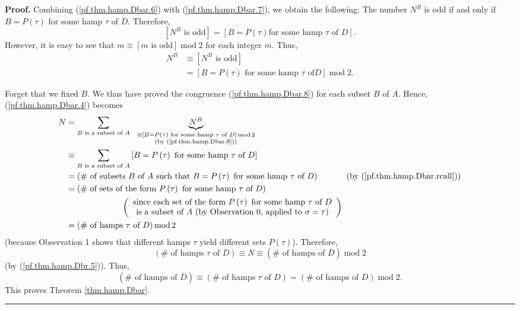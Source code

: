 \documentclass[numbers=enddot,12pt,final,onecolumn,notitlepage]{scrartcl}%
\numberwithin{exer}{subsection}
\theoremstyle{definition}
\newenvironment{proof}[1][Proof]{\noindent\textbf{#1.} }{\ \rule{0.5em}{0.5em}}
\let\sumnonlimits\sum
\renewcommand{\sum}{\sumnonlimits\limits}
\begin{document}
\begin{proof}
Combining (\ref{pf.thm.hamp.Dbar.6}) with (\ref{pf.thm.hamp.Dbar.7}), we
obtain the following: The number $N^{B}$ is odd if and only if $B=P\left(
\tau\right)  $ for some hamp $\tau$ of $D$. Therefore,%
\[
\left[  N^{B}\text{ is odd}\right]  =\left[  B=P\left(  \tau\right)  \text{
for some hamp }\tau\text{ of }D\right]  .
\]
However, it is easy to see that $m\equiv\left[  m\text{ is odd}\right]
\operatorname{mod}2$ for each integer $m$. Thus,%
\begin{align}
N^{B}  &  \equiv\left[  N^{B}\text{ is odd}\right] \nonumber\\
&  =\left[  B=P\left(  \tau\right)  \text{ for some hamp }\tau\text{ of
}D\right]  \operatorname{mod}2. \label{pf.thm.hamp.Dbar.8}%
\end{align}


Forget that we fixed $B$. We thus have proved the congruence
(\ref{pf.thm.hamp.Dbar.8}) for each subset $B$ of $A$. Hence,
(\ref{pf.thm.hamp.Dbar.4}) becomes%
\begin{align*}
N  &  =\sum_{B\text{ is a subset of }A}\ \ \underbrace{N^{B}}%
_{\substack{\equiv\left[  B=P\left(  \tau\right)  \text{ for some hamp }%
\tau\text{ of }D\right]  \operatorname{mod}2\\\text{(by
(\ref{pf.thm.hamp.Dbar.8}))}}}\\
&  \equiv\sum_{B\text{ is a subset of }A}\left[  B=P\left(  \tau\right)
\text{ for some hamp }\tau\text{ of }D\right] \\
&  =\left(  \#\text{ of subsets }B\text{ of }A\text{ such that }B=P\left(
\tau\right)  \text{ for some hamp }\tau\text{ of }D\right)
\ \ \ \ \ \ \ \ \ \ \left(  \text{by (\ref{pf.thm.hamp.Dbar.rcall})}\right) \\
&  =\left(  \#\text{ of sets of the form }P\left(  \tau\right)  \text{ for
some hamp }\tau\text{ of }D\right) \\
&  \ \ \ \ \ \ \ \ \ \ \ \ \ \ \ \ \ \ \ \ \left(
\begin{array}
[c]{c}%
\text{since each set of the form }P\left(  \tau\right)  \text{ for some hamp
}\tau\text{ of }D\\
\text{is a subset of }A\text{ (by Observation 0, applied to }\sigma
=\tau\text{)}%
\end{array}
\right) \\
&  =\left(  \#\text{ of hamps }\tau\text{ of }D\right)  \operatorname{mod}2
\end{align*}
(because Observation 1 shows that different hamps $\tau$ yield different sets
$P\left(  \tau\right)  $). Therefore,%
\[
\left(  \#\text{ of hamps }\tau\text{ of }D\right)  \equiv N\equiv\left(
\#\text{ of hamps of }\overline{D}\right)  \operatorname{mod}2
\]
(by (\ref{pf.thm.hamp.Dbr.5})). Thus,%
\[
\left(  \#\text{ of hamps of }\overline{D}\right)  \equiv\left(  \#\text{ of
hamps }\tau\text{ of }D\right)  =\left(  \#\text{ of hamps of }D\right)
\operatorname{mod}2.
\]
This proves Theorem \ref{thm.hamp.Dbar}.
\end{proof}
\end{document}
